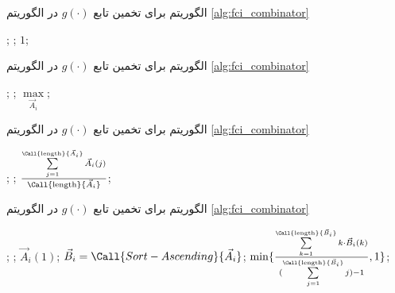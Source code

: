 \begin{algorithm}[t]
\caption{الگوریتم  برای تخمین تابع $g(\cdot)$ در الگوریتم \ref{alg:fci_combinator}}\label{alg:g:const-one}
\begin{latin}
\begin{algorithmic}[1]
		\State {};
		\State {};
	\Else
		\State \Return $1$;
	\EndIf
\EndFunction
\end{algorithmic}
\end{latin}
\end{algorithm}

\begin{algorithm}[t]
\caption{الگوریتم  برای تخمین تابع $g(\cdot)$ در الگوریتم \ref{alg:fci_combinator}}\label{alg:g:max}
\begin{latin}
\begin{algorithmic}[1]
		\State {};
		\State {};
	\Else
		\State \Return $\max\limits_{\vec{A}_i}$;
	\EndIf
\EndFunction
\end{algorithmic}
\end{latin}
\end{algorithm}

\begin{algorithm}[t]
\caption{الگوریتم  برای تخمین تابع $g(\cdot)$ در الگوریتم \ref{alg:fci_combinator}}\label{alg:g:mean}
\begin{latin}
\begin{algorithmic}[1]
		\State {};
		\State {};
	\Else
		\State \Return ${\sum\limits_{j=1}^{\Call{\text{length}}{\vec{A}_i}} \vec{A}_i(j) \over \Call{\text{length}}{\vec{A}_i}}$;
	\EndIf
\EndFunction
\end{algorithmic}
\end{latin}
\end{algorithm}

\begin{algorithm}[t]
\caption{الگوریتم  برای تخمین تابع $g(\cdot)$ در الگوریتم \ref{alg:fci_combinator}}\label{alg:g:k-mean}
\begin{latin}
\begin{algorithmic}[1]
		\State {};
		\State {};
		\State \Return $\vec{A}_i(1)$;
	\Else
		\State $\vec{B}_i = \Call{Sort-Ascending}{\vec{A}_i}$;
		\State \Return $\min\{{\sum\limits_{k = 1}^{\Call{\text{length}}{\vec{B}_i}}  k \cdot \vec{B}_i(k) \over {(\sum\limits_{j=1}^{\Call{\text{length}}{\vec{B}_i}} j) - 1}}, 1\}$;
	\EndIf
\EndFunction
\end{algorithmic}
\end{latin}
\end{algorithm}

